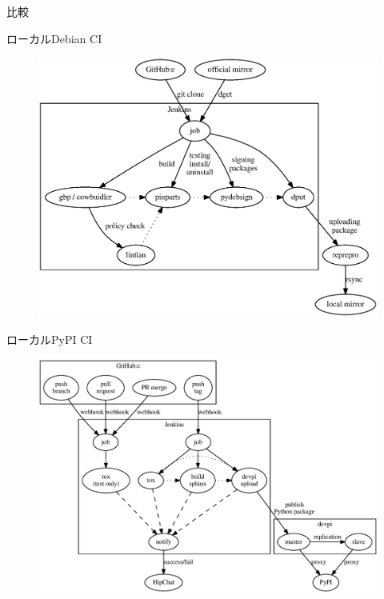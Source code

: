 \begin{frame}{比較}
  \begin{minipage}[t]{0.49\hsize}
    ローカルDebian CI
    \begin{figure}[H]
      \begin{center}
        \includegraphics[width=1.1\hsize]{image201504/debian-ci.eps}
      \end{center}
    \end{figure}
  \end{minipage}
    \begin{minipage}[t]{0.49\hsize}
    ローカルPyPI CI
    \begin{figure}[H]
      \begin{center}
        \includegraphics[width=1.1\hsize]{image201504/python-ci.eps}
      \end{center}
    \end{figure}
  \end{minipage}
\end{frame}

